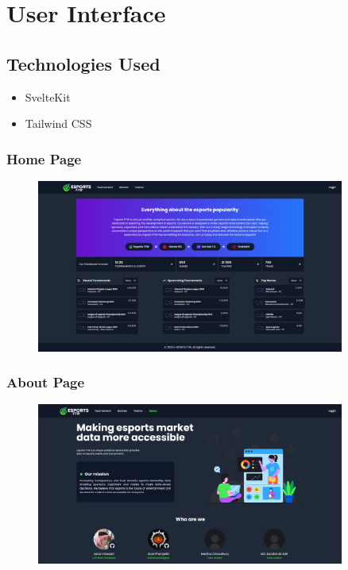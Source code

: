 \chapter{User Interface}
\hrulefill

\section{Technologies Used}
\begin{itemize}
    \item SvelteKit
    \item Tailwind CSS
\end{itemize}

\hrulefill



\subsection{Home Page}
\begin{figure}[H]
    \centering
    \includegraphics[width=0.9\textwidth]{Chapter 3/UI/HomePage}
    \label{fig:Home Page}
\end{figure}

\subsection{About Page}
\begin{figure}[H]
    \centering
    \includegraphics[width=0.9\textwidth]{Chapter 3/UI/about-Page}
    \label{fig:about-Page}
\end{figure}

